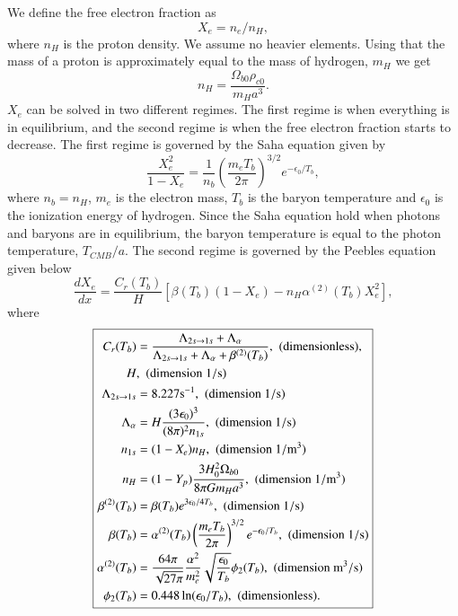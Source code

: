 \documentclass{aa}
\begin{document}
We define the free electron fraction as
\begin{equation}
X_e =  n_e/n_H,
\end{equation}
where $n_H$ is the proton density. We assume no heavier elements. Using that the mass of a proton is approximately equal to the mass of hydrogen, $m_H$
we get \begin{equation}
   n_H = \frac{\Omega_{b0} \rho_{c0}}{m_H a^3}.
\end{equation}
$X_e$ can be solved in two different regimes. The first regime is when everything is in equilibrium, and the second regime is when the free electron fraction starts to decrease.
The first regime is governed by the Saha equation given by
\begin{equation}
   \frac{X_e^2}{1-X_e} = \frac{1}{n_b} \left(\frac{m_e
T_b}{2\pi}\right)^{3/2} e^{-\epsilon_0/T_b},
\end{equation}
where $n_b = n_H$, $m_e$ is the electron mass, $T_b$ is the baryon temperature and $\epsilon_0$ is the ionization energy of hydrogen. Since the Saha equation hold when 
photons and baryons are in equilibrium, the baryon temperature is equal to the photon temperature, $T_{CMB}/a$. The second regime is governed by the Peebles equation given below
\begin{equation}
   \frac{dX_e}{dx} = \frac{C_r(T_b)}{H} \left[\beta(T_b)(1-X_e) - n_H
\alpha^{(2)}(T_b)X_e^2\right],
\end{equation}
where 
$$
\boxed{
\begin{aligned}
C_r(T_b) &= \frac{\Lambda_{2s\rightarrow1s} + \Lambda_{\alpha}}{\Lambda_{2s\rightarrow1s} + \Lambda_{\alpha} + \beta^{(2)}(T_b)}, \,\,{\rm (dimensionless)},\\
H &,  \,\,{\rm (dimension~1/s)}\\
\Lambda_{2s\rightarrow1s} &= 8.227 \textrm{s}^{-1}, \,\,{\rm (dimension~1/s)}\\
\Lambda_{\alpha} &= H\frac{(3\epsilon_0)^3}{(8\pi)^2 n_{1s}}, \,\,{\rm (dimension~1/s)}\\
n_{1s} &= (1-X_e)n_H, \,\,{\rm (dimension~1/m^3)}\\
n_H &= (1-Y_p)\frac{3H_0^2\Omega_{b0}}{8\pi G m_H a^3}, \,\,{\rm (dimension~1/m^3)}\\
\beta^{(2)}(T_b) &= \beta(T_b) e^{3\epsilon_0/4T_b}, \,\,{\rm (dimension~1/s)}\\
\beta(T_b) &= \alpha^{(2)}(T_b) \left(\frac{m_eT_b}{2\pi}\right)^{3/2} e^{-\epsilon_0/T_b}, \,\,{\rm (dimension~1/s)} \\
\alpha^{(2)}(T_b) &= \frac{64\pi}{\sqrt{27\pi}}\frac{\alpha^2}{m_e^2}\sqrt{\frac{\epsilon_0}{T_b}}\phi_2(T_b), \,\,{\rm (dimension~m^3/s)}\\
\phi_2(T_b) &= 0.448\ln(\epsilon_0/T_b), \,\,{\rm (dimensionless)}.
\end{aligned}
}
$$
\end{document}
